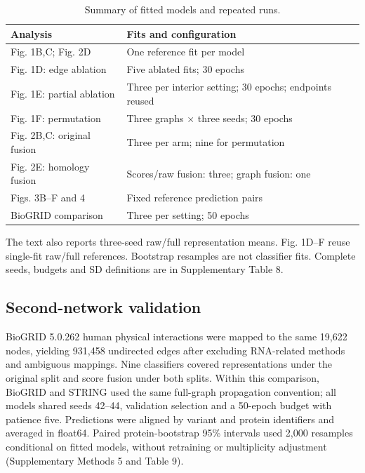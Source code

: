 \documentclass[conference]{IEEEtran}
\begin{document}
\begin{table}[t]
\caption{Summary of fitted models and repeated runs.}
\label{tab:runs}
\centering
\footnotesize
\begin{tabular}{@{}p{}p{}@{}}
\hline
Analysis & Fits and configuration \\
\hline
Fig. 1B,C; Fig. 2D & One reference fit per model \\
Fig. 1D: edge ablation & Five ablated fits; 30 epochs \\
Fig. 1E: partial ablation & Three per interior setting; 30 epochs; endpoints reused \\
Fig. 1F: permutation & Three graphs $\times$ three seeds; 30 epochs \\
Fig. 2B,C: original fusion & Three per arm; nine for permutation \\
Fig. 2E: homology fusion & Scores/raw fusion: three; graph fusion: one \\
Figs. 3B--F and 4 & Fixed reference prediction pairs \\
BioGRID comparison & Three per setting; 50 epochs \\
\hline
\end{tabular}
\par\smallskip\raggedright\footnotesize
The text also reports three-seed raw/full representation means. Fig. 1D--F reuse single-fit raw/full references. Bootstrap resamples are not classifier fits. Complete seeds, budgets and SD definitions are in Supplementary Table 8.
\end{table}

\subsection{Second-network validation}

BioGRID 5.0.262 human physical interactions \cite{Stark2006BioGRID} were mapped to the same 19,622 nodes, yielding 931,458 undirected edges after excluding RNA-related methods and ambiguous mappings. Nine classifiers covered representations under the original split and score fusion under both splits. Within this comparison, BioGRID and STRING used the same full-graph propagation convention; all models shared seeds 42--44, validation selection and a 50-epoch budget with patience five. Predictions were aligned by variant and protein identifiers and averaged in float64. Paired protein-bootstrap 95\% intervals used 2,000 resamples conditional on fitted models, without retraining or multiplicity adjustment (Supplementary Methods 5 and Table 9).
\end{document}
